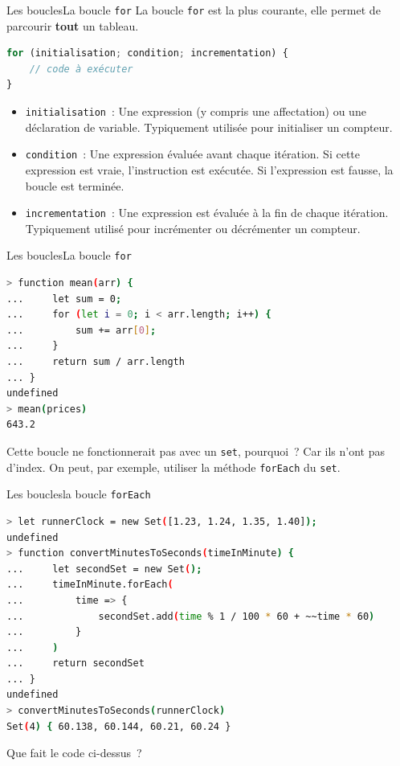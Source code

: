 \documentclass{beamer}
\begin{document}
    \begin{frame}[fragile]{Les boucles}{La boucle \lstinline{for}}
        La boucle \lstinline{for} est la plus courante, elle permet de parcourir \textbf{tout} un tableau.
        \begin{lstlisting}[language=JavaScript,title={\scriptsize{Script JavaScript}}]
for (initialisation; condition; incrementation) {
    // code à exécuter
}
        \end{lstlisting}
        \begin{itemize}
            \item \lstinline{initialisation}~: Une expression (y compris une affectation) ou une déclaration de variable.
            Typiquement utilisée pour initialiser un compteur.
            \item \lstinline{condition}~: Une expression évaluée avant chaque itération.
            Si cette expression est vraie, l'instruction est exécutée.
            Si l'expression est fausse, la boucle est terminée.
            \item \lstinline{incrementation}~: Une expression est évaluée à la fin de chaque itération.
            Typiquement utilisé pour incrémenter ou décrémenter un compteur.
        \end{itemize}
    \end{frame}

    \begin{frame}[fragile]{Les boucles}{La boucle \lstinline{for}}
        \begin{lstlisting}[language=Bash,title={\scriptsize{Node.js}}]
> function mean(arr) {
...     let sum = 0;
...     for (let i = 0; i < arr.length; i++) {
...         sum += arr[0];
...     }
...     return sum / arr.length
... }
undefined
> mean(prices)
643.2
        \end{lstlisting}
        \bigbreak
        Cette boucle ne fonctionnerait pas avec un \lstinline{set}, pourquoi~?
        \pause
        \bigbreak
        Car ils n'ont pas d'index.
        On peut, par exemple, utiliser la méthode \lstinline{forEach} du \lstinline{set}.
    \end{frame}

    \begin{frame}[fragile]{Les boucles}{la boucle \lstinline{forEach}}
        \begin{lstlisting}[language=Bash,title={\scriptsize{Node.js}}]
> let runnerClock = new Set([1.23, 1.24, 1.35, 1.40]);
undefined
> function convertMinutesToSeconds(timeInMinute) {
...     let secondSet = new Set();
...     timeInMinute.forEach(
...         time => {
...             secondSet.add(time % 1 / 100 * 60 + ~~time * 60)
...         }
...     )
...     return secondSet
... }
undefined
> convertMinutesToSeconds(runnerClock)
Set(4) { 60.138, 60.144, 60.21, 60.24 }
        \end{lstlisting}
        \bigbreak
        Que fait le code ci-dessus~?
    \end{frame}
\end{document}

